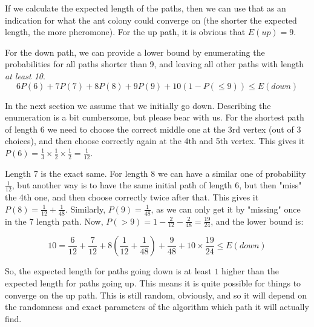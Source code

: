 \documentclass{scrartcl}
\begin{document}
If we calculate the expected length of the paths, then we can use that as
an indication for what the ant colony could converge on (the shorter the
expected length, the more pheromone). For the up path,
it is obvious that $E(up) = 9$.

For the down path, we can provide a lower bound by enumerating the
probabilities for all paths shorter than 9, and leaving all other paths
with length \emph{at least 10}.
\begin{equation}
  6  P(6) + 7  P(7) + 8  P(8) + 9  P(9) + 10(1 - P(\le9)) \le E(down)
\end{equation}

In the next section we assume that we initially go down. Describing the
enumeration is a bit cumbersome, but please bear with us. For the shortest
path of length 6 we need to choose the correct middle one at the 3rd
vertex (out of 3 choices), and then choose correctly again at the 4th and
5th vertex. This gives it $P(6) = \frac{1}{3} \times \frac{1}{2} \times
\frac{1}{2} = \frac{1}{12}$.

Length 7 is the exact same. For length 8 we can have a similar one of
probability $\frac{1}{12}$, but another way is to have the same initial
path of length 6, but then "miss" the 4th one, and then choose
correctly twice after that. This gives it $P(8) = \frac{1}{12} +
\frac{1}{48}$. Similarly, $P(9) = \frac{1}{48}$, as we can only get it by
"missing" once in the 7 length path. Now, $P(>9) = 1 - \frac{2}{12} -
\frac{2}{48} = \frac{19}{24}$, and the lower bound is:

\begin{equation}
  10 = \frac{6}{12} + \frac{7}{12} + 8(\frac{1}{12} + \frac{1}{48}) +
  \frac{9}{48} + 10 \times \frac{19}{24} \le E(down)
\end{equation}

So, the expected length for paths going down is at least $1$ higher
than the expected length for paths going up. This means it is quite
possible for things to converge on the up path. This is still random,
obviously, and so it will depend on the randomness and exact parameters of
the algorithm which path it will actually find.
\end{document}
